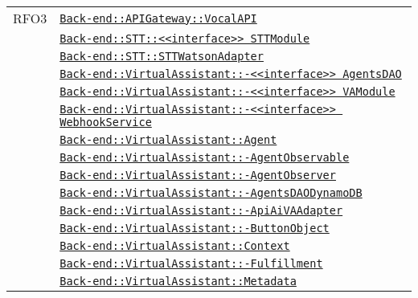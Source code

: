 \begin{longtable}{|>{\centering}m{3cm}|m{10cm}<{\centering}|}
RFO3 & \hyperref[Back-end::APIGateway::VocalAPI]{\texttt{Back-end::APIGateway::VocalAPI}}\\
& \hyperref[Back-end::STT::<<interface>> STTModule]{\texttt{Back-end::STT::<<interface>> STTModule}}\\
& \hyperref[Back-end::STT::STTWatsonAdapter]{\texttt{Back-end::STT::STTWatsonAdapter}}\\
& \hyperref[Back-end::VirtualAssistant::<<interface>> AgentsDAO]{\texttt{Back-end::VirtualAssistant::-\linebreak <<interface>> AgentsDAO}}\\
& \hyperref[Back-end::VirtualAssistant::<<interface>> VAModule]{\texttt{Back-end::VirtualAssistant::-\linebreak <<interface>> VAModule}}\\
& \hyperref[Back-end::VirtualAssistant::<<interface>> WebhookService]{\texttt{Back-end::VirtualAssistant::-\linebreak <<interface>> WebhookService}}\\
& \hyperref[Back-end::VirtualAssistant::Agent]{\texttt{Back-end::VirtualAssistant::Agent}}\\
& \hyperref[Back-end::VirtualAssistant::AgentObservable]{\texttt{Back-end::VirtualAssistant::-\linebreak AgentObservable}}\\
& \hyperref[Back-end::VirtualAssistant::AgentObserver]{\texttt{Back-end::VirtualAssistant::-\linebreak AgentObserver}}\\
& \hyperref[Back-end::VirtualAssistant::AgentsDAODynamoDB]{\texttt{Back-end::VirtualAssistant::-\linebreak AgentsDAODynamoDB}}\\
& \hyperref[Back-end::VirtualAssistant::ApiAiVAAdapter]{\texttt{Back-end::VirtualAssistant::-\linebreak ApiAiVAAdapter}}\\
& \hyperref[Back-end::VirtualAssistant::ButtonObject]{\texttt{Back-end::VirtualAssistant::-\linebreak ButtonObject}}\\
& \hyperref[Back-end::VirtualAssistant::Context]{\texttt{Back-end::VirtualAssistant::Context}}\\
& \hyperref[Back-end::VirtualAssistant::Fulfillment]{\texttt{Back-end::VirtualAssistant::-\linebreak Fulfillment}}\\
& \hyperref[Back-end::VirtualAssistant::Metadata]{\texttt{Back-end::VirtualAssistant::Metadata}}\\

\end{longtable}
